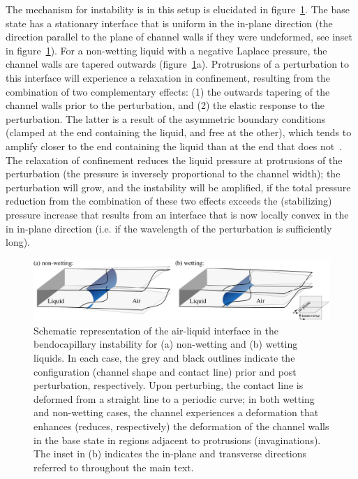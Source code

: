 \documentclass{jfm}
\begin{document}
The mechanism for instability is in this setup is elucidated in figure~\ref{fig:mechanism_schematic}. The base state has a stationary interface that is uniform in the in-plane direction (the direction parallel to the plane of channel walls if they were undeformed, see inset in figure~\ref{fig:mechanism_schematic}). For a non-wetting liquid with a negative Laplace pressure, the channel walls are tapered outwards (figure~\ref{fig:mechanism_schematic}a). Protrusions of a perturbation to this interface will experience a relaxation in confinement, resulting from the combination of two complementary effects: (1) the outwards tapering of the channel walls prior to the perturbation, and (2) the elastic response to the perturbation. The latter is a result of the asymmetric boundary conditions (clamped at the end containing the liquid, and free at the other), which tends to amplify closer to the end containing the liquid than at the end that does not~\citep{Bradley2019PRL}. The relaxation of confinement reduces the liquid pressure at protrusions of the perturbation (the pressure is inversely proportional to the channel width); the perturbation will grow, and the instability will be amplified, if the total pressure reduction from the combination of these two effects exceeds the (stabilizing) pressure increase that results from an interface that is now locally convex in the in in-plane direction (i.e. if the wavelength of the perturbation is sufficiently long).

\begin{figure}
    \centering
    \includegraphics[width=\textwidth]{figures/mechanism_schematic.pdf}
    \caption{Schematic representation of the air-liquid interface in the bendocapillary instability for (a) non-wetting and (b) wetting liquids. In each case, the grey and black outlines indicate the configuration (channel shape and contact line) prior and post perturbation, respectively. Upon perturbing, the contact line is deformed from a straight line to a periodic curve; in both wetting and non-wetting cases, the channel experiences a deformation that enhances (reduces, respectively) the deformation of the channel walls in the base state in regions adjacent to protrusions (invaginations). The inset in (b) indicates the in-plane and transverse directions referred to throughout the main text. }
    \label{fig:mechanism_schematic}
\end{figure}
\end{document}
